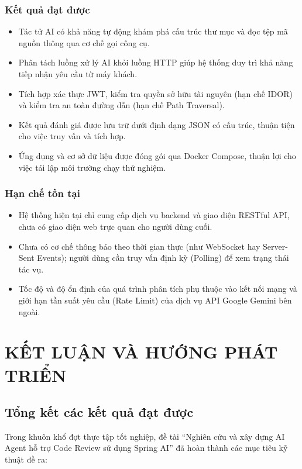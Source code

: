 \documentclass[12pt,a4paper]{report}
\begin{document}
\subsection{Kết quả đạt được}
\begin{itemize}
    \item Tác tử AI có khả năng tự động khám phá cấu trúc thư mục và đọc tệp mã nguồn thông qua cơ chế gọi công cụ.
    \item Phân tách luồng xử lý AI khỏi luồng HTTP giúp hệ thống duy trì khả năng tiếp nhận yêu cầu từ máy khách.
    \item Tích hợp xác thực JWT, kiểm tra quyền sở hữu tài nguyên (hạn chế IDOR) và kiểm tra an toàn đường dẫn (hạn chế Path Traversal).
    \item Kết quả đánh giá được lưu trữ dưới định dạng JSON có cấu trúc, thuận tiện cho việc truy vấn và tích hợp.
    \item Ứng dụng và cơ sở dữ liệu được đóng gói qua Docker Compose, thuận lợi cho việc tái lập môi trường chạy thử nghiệm.
\end{itemize}

\subsection{Hạn chế tồn tại}
\begin{itemize}
    \item Hệ thống hiện tại chỉ cung cấp dịch vụ backend và giao diện RESTful API, chưa có giao diện web trực quan cho người dùng cuối.
    \item Chưa có cơ chế thông báo theo thời gian thực (như WebSocket hay Server-Sent Events); người dùng cần truy vấn định kỳ (Polling) để xem trạng thái tác vụ.
    \item Tốc độ và độ ổn định của quá trình phân tích phụ thuộc vào kết nối mạng và giới hạn tần suất yêu cầu (Rate Limit) của dịch vụ API Google Gemini bên ngoài.
\end{itemize}

\chapter{KẾT LUẬN VÀ HƯỚNG PHÁT TRIỂN}

\section{Tổng kết các kết quả đạt được}
Trong khuôn khổ đợt thực tập tốt nghiệp, đề tài ``Nghiên cứu và xây dựng AI Agent hỗ trợ Code Review sử dụng Spring AI'' đã hoàn thành các mục tiêu kỹ thuật đề ra:
\end{document}
